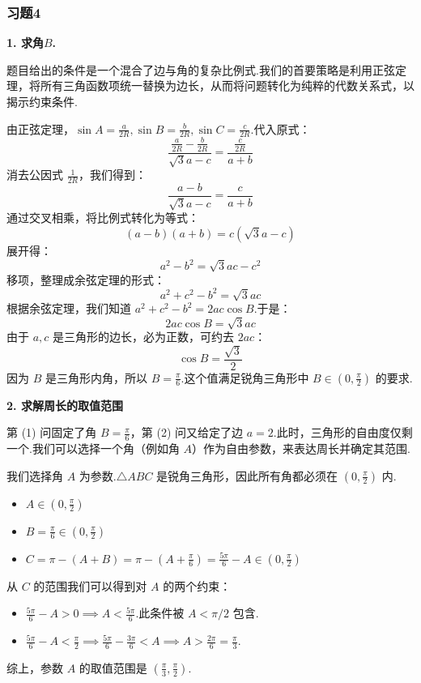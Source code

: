 \subsubsection{习题4}
\begin{solution}
	\textbf{1. 求角$B$.}
	
	题目给出的条件是一个混合了边与角的复杂比例式.我们的首要策略是利用正弦定理，将所有三角函数项统一替换为边长，从而将问题转化为纯粹的代数关系式，以揭示约束条件.
	
	由正弦定理，$\sin A = \frac{a}{2R}, \sin B = \frac{b}{2R}, \sin C = \frac{c}{2R}$.代入原式：
	\[
	\frac{\frac{a}{2R} - \frac{b}{2R}}{\sqrt{3}a - c} = \frac{\frac{c}{2R}}{a+b}
	\]
	消去公因式 $\frac{1}{2R}$，我们得到：
	\[
	\frac{a-b}{\sqrt{3}a - c} = \frac{c}{a+b}
	\]
	通过交叉相乘，将比例式转化为等式：
	\[
	(a-b)(a+b) = c(\sqrt{3}a - c)
	\]
	展开得：
	\[
	a^2 - b^2 = \sqrt{3}ac - c^2
	\]
	移项，整理成余弦定理的形式：
	\[
	a^2 + c^2 - b^2 = \sqrt{3}ac
	\]
	根据余弦定理，我们知道 $a^2 + c^2 - b^2 = 2ac\cos B$.于是：
	\[
	2ac\cos B = \sqrt{3}ac
	\]
	由于 $a,c$ 是三角形的边长，必为正数，可约去 $2ac$：
	\[
	\cos B = \frac{\sqrt{3}}{2}
	\]
	因为 $B$ 是三角形内角，所以 $B = \frac{\pi}{6}$.这个值满足锐角三角形中 $B \in (0, \frac{\pi}{2})$ 的要求.
	
	\textbf{2. 求解周长的取值范围}
	
	第 (1) 问固定了角 $B=\frac{\pi}{6}$，第 (2) 问又给定了边 $a=2$.此时，三角形的自由度仅剩一个.我们可以选择一个角（例如角 $A$）作为自由参数，来表达周长并确定其范围.
	
	我们选择角 $A$ 为参数.$\triangle ABC$ 是锐角三角形，因此所有角都必须在 $(0, \frac{\pi}{2})$ 内.
	\begin{itemize}
		\item $A \in (0, \frac{\pi}{2})$
		\item $B = \frac{\pi}{6} \in (0, \frac{\pi}{2})$ 
		\item $C = \pi - (A+B) = \pi - (A+\frac{\pi}{6}) = \frac{5\pi}{6} - A \in (0, \frac{\pi}{2})$
	\end{itemize}
	从 $C$ 的范围我们可以得到对 $A$ 的两个约束：
	\begin{itemize}
		\item $\frac{5\pi}{6} - A > 0 \implies A < \frac{5\pi}{6}$.此条件被 $A < \pi/2$ 包含.
		\item $\frac{5\pi}{6} - A < \frac{\pi}{2} \implies \frac{5\pi}{6} - \frac{3\pi}{6} < A \implies A > \frac{2\pi}{6} = \frac{\pi}{3}$.
	\end{itemize}
	综上，参数 $A$ 的取值范围是 $(\frac{\pi}{3}, \frac{\pi}{2})$.
	

\end{solution}
